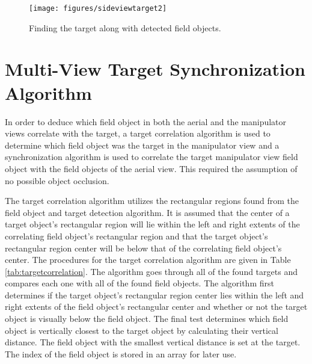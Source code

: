     \begin{figure}%
    \begin{center}
    \texttt{[image: figures/sideviewtarget2]}
    \caption{Finding the target along with detected field objects.}
    \label{fig:target}
    \end{center}
    \end{figure}

  \section{Multi-View Target Synchronization Algorithm}

    In order to deduce which field object in both the aerial and
      the manipulator views correlate with the target, a target
      correlation algorithm is used to determine which field 
      object was the target in the manipulator view and a 
      synchronization algorithm is used to correlate the target 
      manipulator view field object with the field objects of the 
      aerial view.
    This required the assumption of no possible object occlusion.

    The target correlation algorithm utilizes the rectangular
      regions found from the field object and target detection
      algorithm.
    It is assumed that the center of a target object's rectangular
      region will lie within the left and right extents of the
      correlating field object's rectangular region and that
      the target object's rectangular region center will be 
      below that of the correlating field object's center.
    The procedures for the target correlation algorithm are given in 
      Table \ref{tab:targetcorrelation}.
    The algorithm goes through all of the found targets and
      compares each one with all of the found field objects.
    The algorithm first determines if the target object's 
      rectangular region center lies within the left and
      right extents of the field object's rectangular center
      and whether or not the target object is visually below the 
      field object.
    The final test determines which field object is vertically
      closest to the target object by calculating their vertical
      distance.
    The field object with the smallest vertical distance is
      set at the target.
    The index of the field object is stored in an array for later 
      use.


